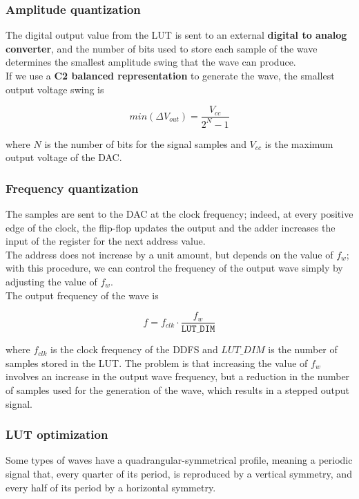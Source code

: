 \newpage

\subsubsection{Amplitude quantization}
The digital output value from the LUT is sent to an external \textbf{digital to analog converter}, and the number of bits used to store each sample of the wave determines the smallest amplitude swing that the wave can produce.\\
If we use a \textbf{C2 balanced representation} to generate the wave, the smallest output voltage swing is

\vspace*{0.25cm} 
\[
    min( \Delta V_{out} ) = \frac{V_{cc}}{2^N - 1}
\]
\vspace*{0.25cm} 

\noindent
where \(N\) is the number of bits for the signal samples and \(V_{cc}\) is the maximum output voltage of the DAC.

\subsubsection{Frequency quantization}
The samples are sent to the DAC at the clock frequency; indeed, at every positive edge of the clock, the flip-flop updates the output and the adder increases the input of the register for the next address value.  \\
The address does not increase by a unit amount, but depends on the value of \(f_w\); with this procedure, we can control the frequency of the output wave simply by adjusting the value of \(f_w\). \\
The output frequency of the wave is

\vspace*{0.25cm} 
\[
    f = f_{clk} \cdot \frac{f_{w}}{\texttt{LUT\_DIM}}
\]
\vspace*{0.25cm} 

\noindent
where \(f_{clk}\) is the clock frequency of the DDFS and \(LUT\_DIM\) is the number of samples stored in the LUT.
The problem is that increasing the value of \(f_w\) involves an increase in the output wave frequency, but a reduction in the number of samples used for the generation of the wave, which results in a stepped output signal.

\newpage

\subsubsection{LUT optimization}
Some types of waves have a quadrangular-symmetrical profile, meaning a periodic signal that, every quarter of its period, is reproduced by a vertical symmetry, and every half of its period by a horizontal symmetry.


